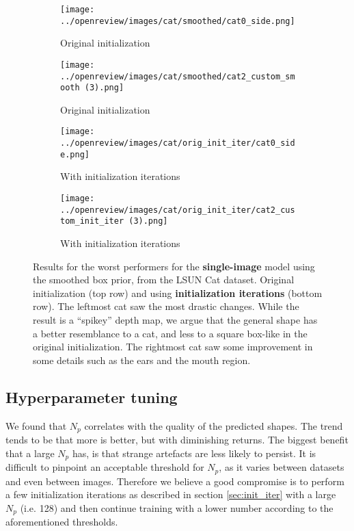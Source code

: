 \begin{figure}[!htb]
    \centering
    \begin{subfigure}{0.4\textwidth}
        \centering
        \texttt{[image: ../openreview/images/cat/smoothed/cat0\_side.png]}
        \caption{Original initialization}
    \end{subfigure}
    \begin{subfigure}{0.4\textwidth}
        \centering
        \texttt{[image: ../openreview/images/cat/smoothed/cat2\_custom\_smooth (3).png]}
        \caption{Original initialization}
    \end{subfigure}
    \begin{subfigure}{0.4\textwidth}
        \centering
        \texttt{[image: ../openreview/images/cat/orig\_init\_iter/cat0\_side.png]}
        \caption{With initialization iterations}
    \end{subfigure}
    \begin{subfigure}{0.4\textwidth}
        \centering
        \texttt{[image: ../openreview/images/cat/orig\_init\_iter/cat2\_custom\_init\_iter (3).png]}
        \caption{With initialization iterations}
    \end{subfigure}
    \caption{Results for the worst performers for the \textbf{single-image} model using the smoothed box prior, from the LSUN Cat dataset. Original initialization (top row) and using \textbf{initialization iterations} (bottom row). The leftmost cat saw the most drastic changes. While the result is a ``spikey'' depth map, we argue that the general shape has a better resemblance to a cat, and less to a square box-like in the original initialization. The rightmost cat saw some improvement in some details such as the ears and the mouth region.}
    \label{fig:init_iter_single}
\end{figure}




\subsection{Hyperparameter tuning}
\label{app:hyperparams-tuning}
We found that $N_p$ correlates with the quality of the predicted shapes. The trend tends to be that more is better, but with diminishing returns. The biggest benefit that a large $N_p$ has, is that strange artefacts are less likely to persist. It is difficult to pinpoint an acceptable threshold for $N_p$, as it varies between datasets and even between images.  Therefore we believe a good compromise is to perform a few initialization iterations as described in section \ref{sec:init_iter} with a large $N_p$ (i.e. 128) and then continue training with a lower number according to the aforementioned thresholds.

